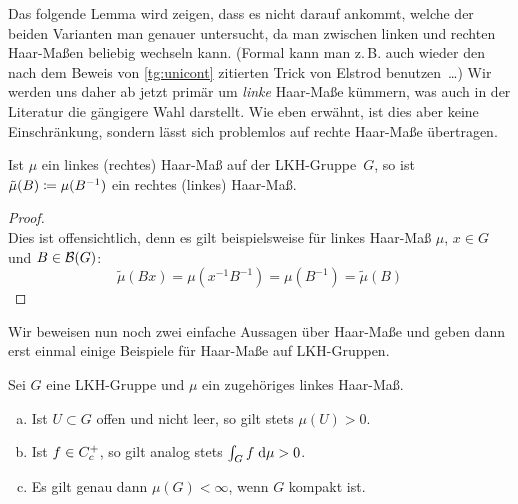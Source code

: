 Das folgende Lemma wird zeigen, dass es nicht darauf ankommt, welche der beiden
Varianten man genauer untersucht, da man zwischen linken und rechten Haar-Maßen
beliebig wechseln kann. (Formal kann man z.\,B. auch wieder den nach dem Beweis
von \cref{tg:unicont} zitierten Trick von Elstrod benutzen~\ldots)
Wir werden uns daher ab jetzt primär um \emph{linke} Haar-Maße kümmern, was
auch in der Literatur die gängigere Wahl darstellt. Wie eben erwähnt, ist dies
aber keine Einschränkung, sondern lässt sich problemlos auf rechte Haar-Maße
übertragen.
%
\begin{thLemma}
    \label{tg:leftrighthaar}
    Ist $\mu$ ein linkes (rechtes) Haar-Maß auf der LKH-Gruppe~$G$, 
    so ist $\tilde\mu(B) \coloneqq \mu(B^{-1})$ ein rechtes (linkes) Haar-Maß.
\end{thLemma}

\begin{proof}\hfill\\
    Dies ist offensichtlich, denn es gilt beispielsweise für linkes Haar-Maß
    $\mu$, $x\in G$ und $B\in\mathcal{B}(G)$:
    \[ \tilde\mu(Bx) = \mu(x^{-1}B^{-1}) = \mu(B^{-1}) = \tilde\mu(B) \]
\end{proof}

Wir beweisen nun noch zwei einfache Aussagen über Haar-Maße und geben dann erst
einmal einige Beispiele für Haar-Maße auf LKH-Gruppen.

\begin{thLemma}
    \label{tg:haarbasics}
    Sei $G$ eine LKH-Gruppe und $\mu$ ein zugehöriges linkes Haar-Maß.
    \begin{enumerate}[a)]
        \item\label{tg:haarbasics:openset}
            Ist $U\subset G$ offen und nicht leer, so gilt stets $\mu(U)>0$.
        \item\label{tg:haarbasics:int}
            Ist $f\in C_c^+$, so gilt analog stets $\int_G f\;\mathrm{d} \mu>0$.
        \item\label{tg:haarbasics:compactness}
            Es gilt genau dann $\mu(G)<\infty$, wenn $G$ kompakt ist.
    \end{enumerate}
\end{thLemma}

